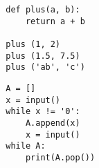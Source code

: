 \documentclass[a4paper, fleqn]{article}
\begin{document}
	\begin{lstlisting}
		def plus(a, b):
			return a + b
		
		plus (1, 2)
		plus (1.5, 7.5)
		plus ('ab', 'c')
	\end{lstlisting}
	
	\begin{lstlisting}
		A = []
		x = input()
		while x != '0':
			A.append(x)
			x = input()
		while A:
			print(A.pop())
	\end{lstlisting}
	
		
	\subsection*{}
	
	
	\subsection*{}
	
	
	\subsection*{}
	
	
	\subsection*{}
	
\end{document}
